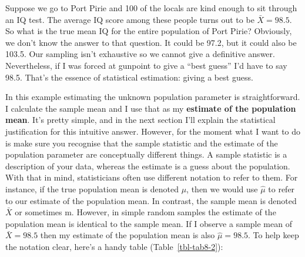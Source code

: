 \documentclass[
  a4paper,
]{book}
\begin{document}
Suppose we go to Port Pirie and 100 of the locals are kind enough to sit
through an IQ test. The average IQ score among these people turns out to
be \(\bar{X}=98.5\). So what is the true mean IQ for the entire
population of Port Pirie? Obviously, we don't know the answer to that
question. It could be 97.2, but it could also be 103.5. Our sampling
isn't exhaustive so we cannot give a definitive answer. Nevertheless, if
I was forced at gunpoint to give a ``best guess'' I'd have to say 98.5.
That's the essence of statistical estimation: giving a best guess.

In this example estimating the unknown population parameter is
straightforward. I calculate the sample mean and I use that as my
\textbf{estimate of the population mean}. It's pretty simple, and in the
next section I'll explain the statistical justification for this
intuitive answer. However, for the moment what I want to do is make sure
you recognise that the sample statistic and the estimate of the
population parameter are conceptually different things. A sample
statistic is a description of your data, whereas the estimate is a guess
about the population. With that in mind, statisticians often use
different notation to refer to them. For instance, if the true
population mean is denoted \(\mu\), then we would use \(\hat{\mu}\) to
refer to our estimate of the population mean. In contrast, the sample
mean is denoted \(\bar{X}\) or sometimes m. However, in simple random
samples the estimate of the population mean is identical to the sample
mean. If I observe a sample mean of \(\bar{X}=98.5\) then my estimate of
the population mean is also \(\hat{\mu}=98.5\). To help keep the
notation clear, here's a handy table (Table~\ref{tbl-tab8-2}):

\hypertarget{tbl-tab8-2}{}
 
  \providecommand{\huxb}[2]{\arrayrulecolor[RGB]{#1}\global\arrayrulewidth=#2pt}
  \providecommand{\huxvb}[2]{\color[RGB]{#1}\vrule width #2pt}
  \providecommand{\huxtpad}[1]{\rule{0pt}{#1}}
  \providecommand{\huxbpad}[1]{\rule[-#1]{0pt}{#1}}
\end{document}
